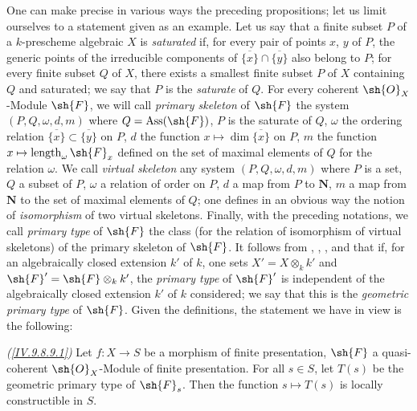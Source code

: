\begin{remark}[9.8.9]
\label{IV.9.8.9}
One can make precise in various ways the preceding propositions; let us limit ourselves to a statement given as an example.
Let us say that a finite subset $P$ of a $k$-prescheme algebraic $X$ is \emph{saturated} if, for every pair of points $x$, $y$ of $P$, the generic points of the irreducible components of $\overline{\{x\}}\cap\overline{\{y\}}$ also belong to $P$; for every finite subset $Q$ of $X$, there exists a smallest finite subset $P$ of $X$ containing $Q$ and saturated; we say that $P$ is the \emph{saturate} of $Q$.
For every coherent $\sh{O}_X$-Module $\sh{F}$, we will call \emph{primary skeleton} of $\sh{F}$ the system $(P,Q,\omega,d,m)$ where $Q=\operatorname{Ass}(\sh{F})$, $P$ is the saturate of $Q$, $\omega$ the ordering relation $\overline{\{x\}}\subset\overline{\{y\}}$ on $P$, $d$ the function $x\mapsto\dim\overline{\{x\}}$ on $P$, $m$ the function $x\mapsto\operatorname{length}_\omega\sh{F}_x$ defined on the set of maximal elements of $Q$ for the relation $\omega$.
We call \emph{virtual skeleton} any system $(P,Q,\omega,d,m)$ where $P$ is a set, $Q$ a subset of $P$, $\omega$ a relation of order on $P$, $d$ a map from $P$ to $\mathbf{N}$, $m$ a map from $\mathbf{N}$ to the set of maximal elements of $Q$; one defines in an obvious way the notion of \emph{isomorphism} of two virtual skeletons.
Finally, with the preceding notations, we call \emph{primary type} of $\sh{F}$ the class (for the relation of isomorphism of virtual skeletons) of the primary skeleton of $\sh{F}$.
It follows from , , ,  and  that if, for an algebraically closed extension $k'$ of $k$, one sets $X'=X\otimes_k k'$ and $\sh{F}'=\sh{F}\otimes_k k'$, the \emph{primary type} of $\sh{F}'$ is independent of
the algebraically closed extension $k'$ of $k$ considered; we say that this is the \emph{geometric primary type} of $\sh{F}$.
Given the definitions, the statement we have in view is the following:

\medskip
\noindent
\emph{(\ref{IV.9.8.9.1})}
\label{IV.9.8.9.1}
Let $f:X\to S$ be a morphism of finite presentation, $\sh{F}$ a quasi-coherent $\sh{O}_X$-Module of finite presentation.
For all $s\in S$, let $T(s)$ be the geometric primary type of $\sh{F}_s$.
Then the function $s\mapsto T(s)$ is locally constructible in $S$.


\end{remark}
